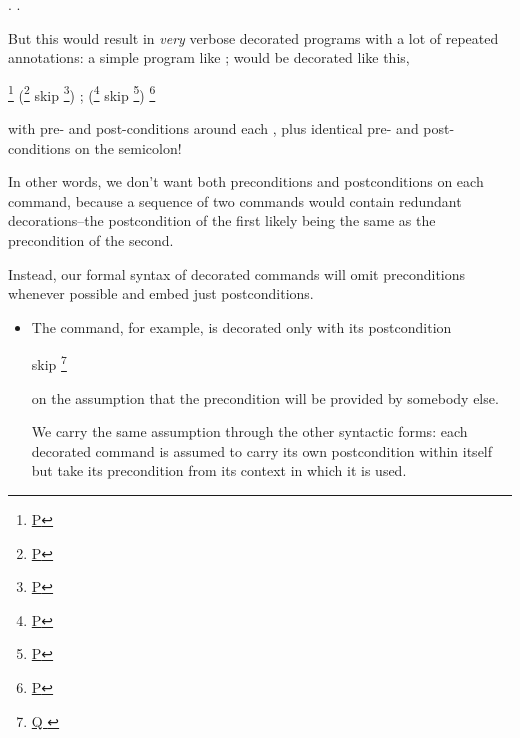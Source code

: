 \documentclass[12pt]{report}
\begin{document}
\begin{coqdoccode}
\coqdocnoindent
{}       .\coqdoceol
\coqdocemptyline
\coqdocnoindent
{} .\coqdoceol
\coqdocemptyline
\end{coqdoccode}
But this would result in \textit{very} verbose decorated programs with a
    lot of repeated annotations: a simple program like
    ; would be decorated like this,


        \footnote{\url{P}} (\footnote{\url{P}} skip \footnote{\url{P}}) ; (\footnote{\url{P}} skip \footnote{\url{P}}) \footnote{\url{P}}


    with pre- and post-conditions around each , plus identical
    pre- and post-conditions on the semicolon! 

 In other words, we don't want both preconditions and
    postconditions on each command, because a sequence of two commands
    would contain redundant decorations--the postcondition of the
    first likely being the same as the precondition of the second.


    Instead, our formal syntax of decorated commands will omit
    preconditions whenever possible and embed just postconditions. 


\begin{itemize}
\item  The  command, for example, is decorated only with its
      postcondition


      skip \footnote{\url{ Q }}


      on the assumption that the precondition will be provided by
      somebody else.


      We carry the same assumption through the other syntactic forms:
      each decorated command is assumed to carry its own postcondition
      within itself but take its precondition from its context in
      which it is used. 
\end{itemize}
\end{document}
